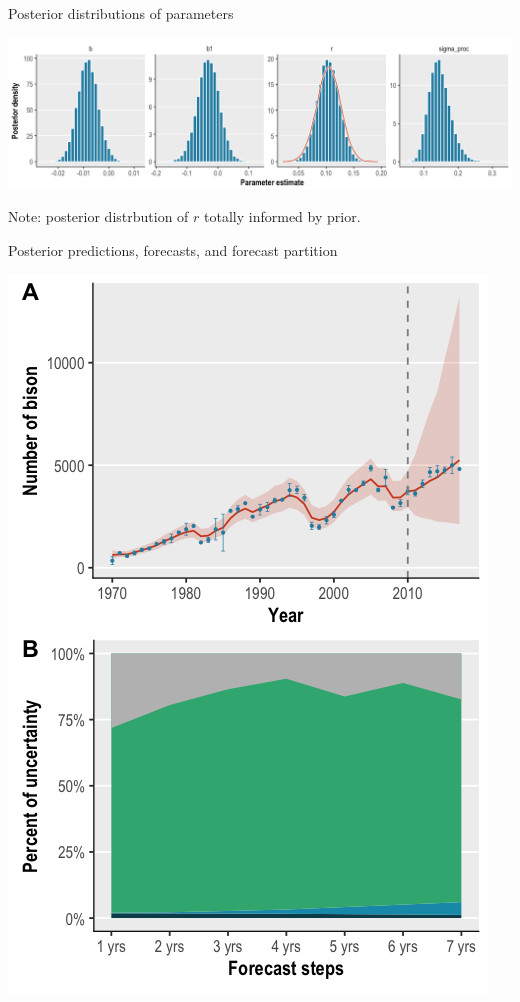 \documentclass[11pt, compress, aspectratio=1610]{beamer}
\begin{document}
\begin{frame}{%
\protect\hypertarget{posterior-distributions-of-parameters}{%
Posterior distributions of parameters}}

\includegraphics[width=\textwidth]{../figures/bison_post_params.png}

\alert{Note}: posterior distrbution of \(r\) totally informed by prior.

\end{frame}

\begin{frame}{%
\protect\hypertarget{posterior-predictions-forecasts-and-forecast-partition}{%
Posterior predictions, forecasts, and forecast partition}}

\includegraphics[height=\textheight]{../figures/bison_combined.png}

\end{frame}
\end{document}
